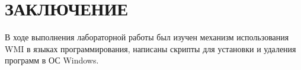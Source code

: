 \section*{ЗАКЛЮЧЕНИЕ}

В ходе выполнения лабораторной работы был изучен механизм использования WMI
в языках программирования, написаны скрипты для установки и удаления программ
в ОС Windows.

\newpage
